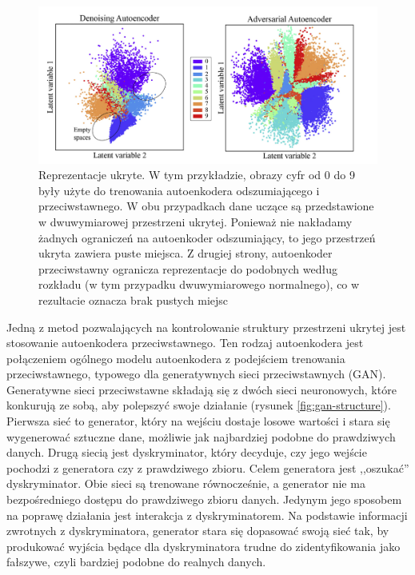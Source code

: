 \documentclass[12pt]{mwbk}
\theoremstyle{plain}
\theoremstyle{definition}
\theoremstyle{remark}
\newcommand\zrodlo[1]{\par\vspace{-3mm}{\small\textit{Źródło: }#1 }}
\begin{document}
\begin{figure}[!h]
	\centering
	\includegraphics[width=\linewidth]{rys/adversial_autoencoder.png}
	\caption{Reprezentacje ukryte. W tym przykładzie, obrazy cyfr od 0 do 9 były użyte do trenowania autoenkodera odszumiającego i przeciwstawnego. W obu przypadkach dane uczące są przedstawione w dwuwymiarowej przestrzeni ukrytej. Ponieważ nie nakładamy żadnych ograniczeń na autoenkoder odszumiający, to jego przestrzeń ukryta zawiera puste miejsca. Z drugiej strony, autoenkoder przeciwstawny ogranicza reprezentacje do podobnych według rozkładu (w tym przypadku dwuwymiarowego normalnego), co w rezultacie oznacza brak pustych miejsc}
	\zrodlo{\cite{pinaya}}
	\label{fig:latent-spaces}
\end{figure}

Jedną z metod pozwalających na kontrolowanie struktury przestrzeni ukrytej jest stosowanie autoenkodera przeciwstawnego. Ten rodzaj autoenkodera jest połączeniem ogólnego modelu autoenkodera z podejściem trenowania przeciwstawnego, typowego dla generatywnych sieci przeciwstawnych (GAN). Generatywne sieci przeciwstawne składają się z dwóch sieci neuronowych, które konkurują ze sobą, aby polepszyć swoje działanie (rysunek \ref{fig:gan-structure}). Pierwsza sieć to generator, który na wejściu dostaje losowe wartości i stara się wygenerować sztuczne dane, możliwie jak najbardziej podobne do prawdziwych danych. Drugą siecią jest dyskryminator, który decyduje, czy jego wejście pochodzi z generatora czy z prawdziwego zbioru. Celem generatora jest ,,oszukać'' dyskryminator. Obie sieci są trenowane równocześnie, a generator nie ma bezpośredniego dostępu do prawdziwego zbioru danych. Jedynym jego sposobem na poprawę działania jest interakcja z dyskryminatorem. Na podstawie informacji zwrotnych z dyskryminatora, generator stara się dopasować swoją sieć tak, by produkować wyjścia będące dla dyskryminatora trudne do zidentyfikowania jako fałszywe, czyli bardziej podobne do realnych danych.
\end{document}
